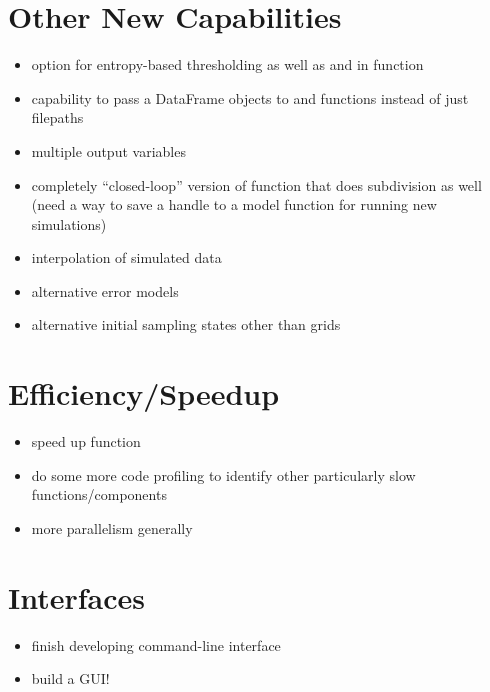 \documentclass[letterpaper,10pt,english]{sphinxmanual}
\begin{document}
\section{Other New Capabilities}
\label{\detokenize{futurefeatures:other-new-capabilities}}\begin{itemize}
\item {}
option for entropy-based thresholding as well as  and  in  function

\item {}
capability to pass a DataFrame objects to  and  functions instead of just filepaths

\item {}
multiple output variables

\item {}
completely “closed-loop” version of  function that does subdivision as well (need a way to save a handle to a model function for running new simulations)

\item {}
interpolation of simulated data

\item {}
alternative error models

\item {}
alternative initial sampling states other than grids

\end{itemize}


\section{Efficiency/Speedup}
\label{\detokenize{futurefeatures:efficiency-speedup}}\begin{itemize}
\item {}
speed up  function

\item {}
do some more code profiling to identify other particularly slow functions/components

\item {}
more parallelism generally

\end{itemize}


\section{Interfaces}
\label{\detokenize{futurefeatures:interfaces}}\begin{itemize}
\item {}
finish developing command-line interface

\item {}
build a GUI!

\end{itemize}
\end{document}
